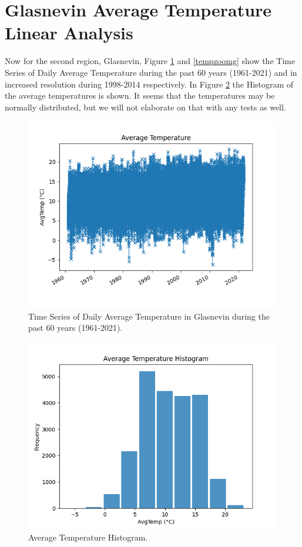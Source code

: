\documentclass[conference]{IEEEtran}
\begin{document}
\section{Glasnevin Average Temperature \break Linear Analysis}

Now for the second region, Glasnevin, Figure \ref{tempg} and \ref{tempzoomg} show the Time Series of Daily Average Temperature during the past 60 years (1961-2021) and in increased resolution during 1998-2014 respectively. In Figure \ref{temphistg} the Histogram of the average temperatures is shown. It seems that the temperatures may be normally distributed, but we will not elaborate on that with any tests as well.

\begin{figure}[ht]
    \centering
    \includegraphics[scale=0.40]{Figures/GlasnevinLin/Average Temperature Time Series.png}
    \caption{Time Series of Daily Average Temperature in Glasnevin during the past 60 years (1961-2021).}
    \label{tempg}
\end{figure}

\begin{figure}[ht]
    \centering
    \includegraphics[scale=0.40]{Figures/GlasnevinLin/Average Temperature Histogram.png}
    \caption{Average Temperature Histogram.}
    \label{temphistg}
\end{figure}
\vspace{50mm}
\end{document}
